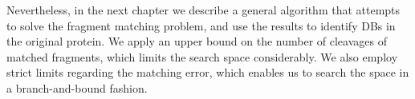 Nevertheless, in the next chapter we describe a general algorithm that attempts to solve the fragment matching problem, and use the results to identify DBs in the original protein. We apply an upper bound on the number of cleavages of matched fragments, which limits the search space considerably. We also employ strict limits regarding the matching error, which enables us to search the space in a branch-and-bound fashion.




